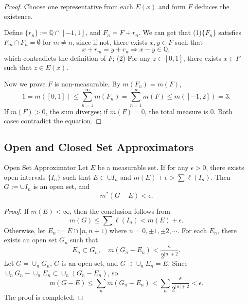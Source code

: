 \begin{proof}
  Choose one representative from each $E(x)$ and form $F$ deduces the existence.

  Define $\{r_n\} := \mathbb{Q} \cap [-1, 1]$, and $F_n = F + r_n$.
  We can get that
  (1)$\{F_n\}$ satisfies $F_m \cap F_n = \emptyset$ for $m \neq n$, since if not,
  there exists $x, y \in F$ such that
  \begin{equation}
    x + r_m = y + r_n \Rightarrow x - y \in \mathbb{Q},
  \end{equation}
  which contradicts the definition of $F$;
  (2) For any $z \in [0, 1]$, there exists $x \in F$ such that $z \in E(x)$.

  Now we prove $F$ is non-measurable. By $m(F_n) = m(F)$,
  \begin{equation}
    1 = m([0, 1]) \leq \sum\limits_{n = 1}^{\infty} m(F_n)
    = \sum\limits_{n = 1}^{\infty} m(F) \leq m([-1, 2]) = 3.
  \end{equation}
  If $m(F) > 0$, the sum diverges; if $m(F) = 0$, the total measure is $0$.
  Both cases contradict the equation.
\end{proof}

\subsection{Open and Closed Set Approximators}

\begin{theorem}{Open Set Approximator}{}
  Let $E$ be a measurable set.
  If for any $\epsilon > 0$, there exists open intervals $\{I_n\}$ such that
  $E \subset \cup I_n$ and $m(E) + \epsilon > \sum \ell(I_n)$.
  Then $G := \cup I_n$ is an open set, and
  \begin{equation}
    m^{\ast}(G - E) < \epsilon.
  \end{equation}
\end{theorem}

\begin{proof}
  If $m(E) < \infty$, then the conclusion follows from
  \begin{equation}
    m(G) \leq \sum \ell(I_n) < m(E) + \epsilon.
  \end{equation}
  Otherwise, let $E_n := E \cap [n, n+1)$ where $n = 0, \pm 1, \pm 2, \cdots$.
  For each $E_n$, there exists an open set $G_n$ such that
  \begin{equation}
    E_n \subset G_n, \quad m(G_n - E_n) < \frac{\epsilon}{2^{|n| + 2}}.
  \end{equation}
  Let $G = \cup_n G_n$, $G$ is an open set, and $G \supset \cup _n E_n = E$.
  Since $\cup_n G_n - \cup_n E_n \subset \cup_n (G_n - E_n)$, so
  \begin{equation}
    m(G - E) \leq \sum _n m(G_n - E_n) < \sum_n \frac{\epsilon}{2^{|n| + 2}} < \epsilon.
  \end{equation}
  The proof is completed.
\end{proof}

